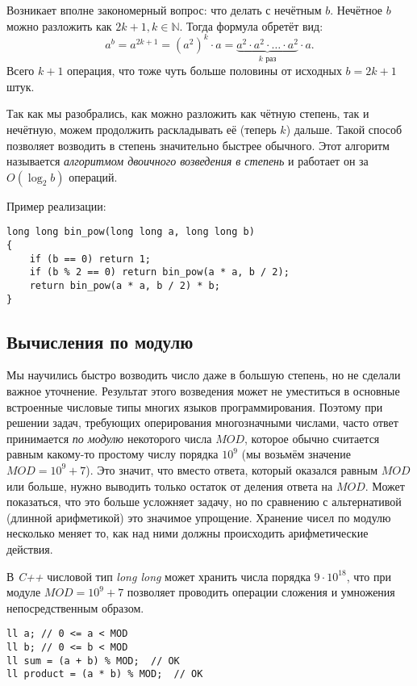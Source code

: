 \documentclass[a4paper,8pt]{article}
\begin{document}
        Возникает вполне закономерный вопрос: что делать с нечётным $b$. Нечётное $b$ можно разложить как $2k + 1, k \in \mathbb{N}$. Тогда формула обретёт вид:
        \[a^b = a^{2k + 1} = (a^{2})^k \cdot a = \underbrace{a^2 \cdot a^2 \cdot \ldots \cdot a^2}_\text{\(k\) раз} \cdot a.\]
        Всего $k + 1$ операция, что тоже чуть больше половины от исходных $b = 2k + 1$ штук.

        Так как мы разобрались, как можно разложить как чётную степень, так и нечётную, можем продолжить раскладывать её (теперь $k$) дальше. Такой способ позволяет возводить в степень значительно быстрее обычного. Этот алгоритм называется \emph{алгоритмом двоичного возведения в степень} и работает он за \(O(\log_2{b})\) операций.



        Пример реализации:
\begin{lstlisting}
long long bin_pow(long long a, long long b)
{
    if (b == 0) return 1;
    if (b % 2 == 0) return bin_pow(a * a, b / 2);
    return bin_pow(a * a, b / 2) * b;
}
\end{lstlisting}
    \subsection{Вычисления по модулю}

    Мы научились быстро возводить число даже в большую степень, но не сделали важное уточнение. Результат этого возведения может не уместиться в основные встроенные числовые типы многих языков программирования. Поэтому при решении задач, требующих оперирования многозначными числами, часто ответ принимается \emph{по модулю} некоторого числа $MOD$, которое обычно считается равным какому-то простому числу порядка $10^9$ (мы возьмём значение $MOD=10^9+7$). Это значит, что вместо ответа, который оказался равным $MOD$ или больше, нужно выводить только остаток от деления ответа на $MOD$. Может показаться, что это больше усложняет задачу, но по сравнению с альтернативой (длинной арифметикой) это значимое упрощение. Хранение чисел по модулю несколько меняет то, как над ними должны происходить арифметические действия.

    В \textit{C++} числовой тип \textit{long long} может хранить числа порядка $9\cdot 10^{18}$, что при модуле $MOD=10^9+7$ позволяет проводить операции сложения и умножения непосредственным образом.
\begin{lstlisting}
ll a; // 0 <= a < MOD
ll b; // 0 <= b < MOD
ll sum = (a + b) % MOD;  // OK
ll product = (a * b) % MOD;  // OK
\end{lstlisting}
\end{document}

